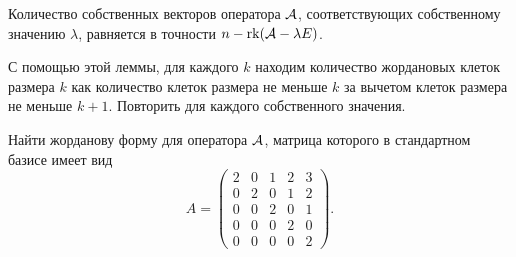 \begin{corollary}
	Количество собственных векторов оператора $\mathcal{A}$, соответствующих собственному значению $\lambda$, равняется в точности $n - \operatorname{rk}(\mathcal{A} - \lambda E)$.
\end{corollary}

С помощью этой леммы, для каждого $k$ находим количество жордановых клеток размера $k$ как количество клеток размера не меньше $k$ за вычетом клеток размера не меньше $k + 1$. Повторить для каждого собственного значения.

\begin{problem}
	Найти жорданову форму для оператора $\mathcal{A}$, матрица которого в стандартном базисе имеет вид
	\[
		A =
		\begin{pmatrix}
			2 & 0 & 1 & 2 & 3\\
			0 & 2 & 0 & 1 & 2\\
			0 & 0 & 2 & 0 & 1\\
			0 & 0 & 0 & 2 & 0\\
			0 & 0 & 0 & 0 & 2
		\end{pmatrix}.
	\]
\end{problem}

